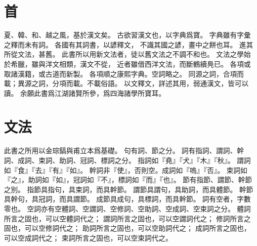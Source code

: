 \chapter*{首}
夏、韓、和、越之風，基於漢文矣。
古欲習漢文也，以字典爲寶。
字典雖有字彙之釋而未有詞。
各國有其詞書，以諺釋文，
不識其國之諺，畫中之餅也耳。
進其所從文法，甚舊。
此書所以用新文法者，徒以舊文法之不調不和也。
文法之學始於希臘，雖與洋文相類，漢文不從，
近者雖借西洋文法，而斷鶴續鳧已\parencite{Ahn:2012}。
各項或取諸漢籍，或古道而新製。
各項順之康熙字典。空詞略之。
同源之詞，合項而載；異源之詞，分項而載。不載俗語。
以文釋文，詳述其用，弱通漢文，皆可以讀。
余願此書爲江湖諸賢所參，爲四海諸學所寶耳。
\chapter*{文法}
此書之所用以金琮鎬與甫立本爲基礎。
句有詞、節之分。
詞有指詞、謂詞、幹詞、成詞、束詞、助詞、冠詞、標詞之分\parencites[43-4]{Pulleyblank:2005}[2-35]{Kim:2019}。
指詞如『堯』『犬』『木』『秋』。
謂詞如『食』『去』『有』『如』。
幹詞非『使』，否則空。成詞如『嗚』『否』。
束詞如『之』，助詞如『如』，冠詞如『不』，標詞如『而』『也』。
節有指節、謂節、幹節之別\parencite[15]{Kim:2019}。
指節具指句，具束詞，而具幹節。
謂節具謂句，具助詞，而具體節。
幹節具幹句，具冠詞，而具謂節。
成節具成句，具標詞，而具幹節。
詞有空者，字數零也\parencite[2]{Kim:2019}。
空詞亦有空體詞、空謂詞、空修詞、空助詞、空成詞、空束詞之分。
體詞所言之固也，可以空體詞代之；
謂詞所言之固也，可以空謂詞代之；
修詞所言之固也，可以空修詞代之；
助詞所言之固也，可以空助詞代之；
成詞所言之固也，可以空成詞代之；
束詞所言之固也，可以空束詞代之。
